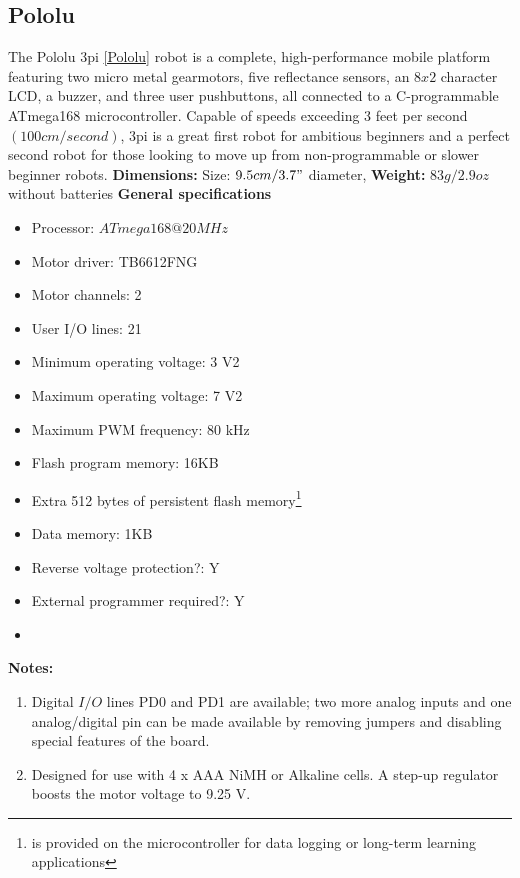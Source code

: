 \subsection{Pololu \label{Pololu}}

The Pololu 3pi \ref{Pololu}  robot is a complete, high-performance mobile platform featuring two micro metal gearmotors, five reflectance sensors, an $8x2$ character LCD, a buzzer, and three user pushbuttons, all connected to a C-programmable ATmega168 microcontroller. Capable of speeds exceeding 3 feet per second $(100 cm/second)$, 3pi is a great first robot for ambitious beginners and a perfect second robot for those looking to move up from non-programmable or slower beginner robots.
\textbf{Dimensions:}
Size: 	$9.5 cm/3.7"$ diameter,
\textbf{Weight:}
$83 g/2.9 oz$ without batteries
\textbf{General specifications}
\begin{itemize}
\item Processor: 	$ATmega168 @ 20 MHz$
\item Motor driver: 	TB6612FNG
\item Motor channels: 	2
\item User I/O lines: 	21
\item Minimum operating voltage: 	3 V2
\item Maximum operating voltage: 	7 V2
\item Maximum PWM frequency: 	80 kHz
\item Flash program memory: 16KB
\item Extra 512 bytes of persistent flash memory\footnote{is provided on the microcontroller for data logging or long-term learning applications}
\item Data memory: 1KB
\item Reverse voltage protection?: 	Y
\item External programmer required?: 	Y
\item
\end{itemize}
\textbf{Notes:}
\begin{enumerate}
\item Digital $I/O$ lines PD0 and PD1 are available; two more analog inputs and one analog/digital pin can be made available by removing jumpers and disabling special features of the board.
\item Designed for use with 4 x AAA NiMH or Alkaline cells. A step-up regulator boosts the motor voltage to 9.25 V.
\end{enumerate}

